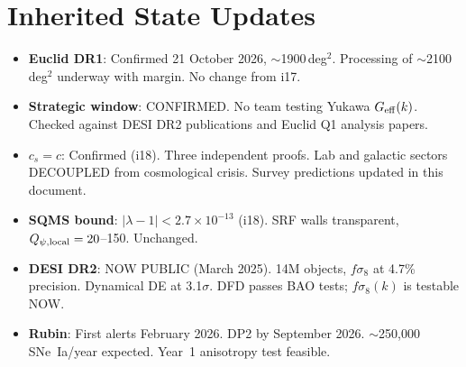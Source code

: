 \documentclass[11pt,a4paper]{article}
\newcommand{\ee}[1]{\times 10^{#1}}
\newcommand{\Geff}{G_{\rm eff}}
\begin{document}
\section{Inherited State Updates}
\label{sec:inherited}

\begin{itemize}[nosep]
\item \textbf{Euclid DR1}: Confirmed 21 October 2026, $\sim$1900\,deg$^2$.
  Processing of $\sim$2100\,deg$^2$ underway with margin.
  No change from i17.
\item \textbf{Strategic window}: CONFIRMED. No team testing Yukawa
  $\Geff(k)$. Checked against DESI DR2 publications and Euclid Q1
  analysis papers.
\item \textbf{$c_s = c$}: Confirmed (i18). Three independent proofs.
  Lab and galactic sectors DECOUPLED from cosmological crisis.
  Survey predictions updated in this document.
\item \textbf{SQMS bound}: $|\lambda - 1| < 2.7 \ee{-13}$ (i18).
  SRF walls transparent, $Q_{\psi,\rm local} = 20$--150. Unchanged.
\item \textbf{DESI DR2}: NOW PUBLIC (March 2025). 14M objects,
  $f\sigma_8$ at 4.7\% precision. Dynamical DE at 3.1$\sigma$.
  DFD passes BAO tests; $f\sigma_8(k)$ is testable NOW.
\item \textbf{Rubin}: First alerts February 2026. DP2 by September 2026.
  $\sim$250,000 SNe~Ia/year expected. Year~1 anisotropy test feasible.
\end{itemize}
\end{document}
